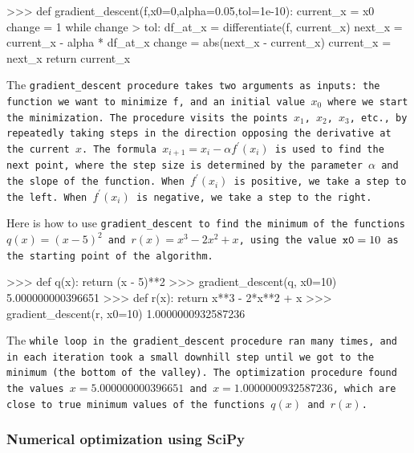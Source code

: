			\begin{codeblock}
			>>> def gradient_descent(f,x0=0,alpha=0.05,tol=1e-10):
			        current_x = x0
			        change = 1
			        while change > tol:
			            df_at_x = differentiate(f, current_x)
			            next_x = current_x - alpha * df_at_x
			            change = abs(next_x - current_x)
			            current_x = next_x
			        return current_x
			\end{codeblock} 

			The  \tt{gradient\_descent} procedure takes two arguments as inputs:
			the function we want to minimize \tt{f},
			and an initial value $x_0$ where we start the minimization.
			The procedure visits the points $x_1$, $x_2$, $x_3$, etc.,
			by repeatedly taking steps
			in the direction opposing the derivative at the current $x$.
			The formula $x_{i+1} = x_i - \alpha f^{\prime\!}(x_i)$ is used to find the next point,
			where the step size is determined by the parameter $\alpha$
			and the slope of the function.
			When $f^{\prime\!}(x_i)$ is positive,
			we take a step to the left.
			When $f^{\prime\!}(x_i)$ is negative,
			we take a step to the right.

			Here is how to use \tt{gradient\_descent}
			to find the minimum of the functions $q(x) = (x-5)^2$ and $r(x) = x^3-2x^2+x$,
			using the value $\tt{x0} = 10$ as the starting point of the algorithm.

			\begin{codeblock}
			>>> def q(x):
			        return (x - 5)**2
			>>> gradient_descent(q, x0=10)
			5.000000000396651
			>>> def r(x):
			        return x**3 - 2*x**2 + x
			>>> gradient_descent(r, x0=10)
			1.0000000932587236
			\end{codeblock}

			\noindent
			The \tt{while} loop in the \tt{gradient\_descent} procedure ran many times,
			and in each iteration took a small downhill step
			until we got to the minimum (the bottom of the valley).
			The optimization procedure found the values $x=5.000000000396651$
			and $x=1.0000000932587236$,
			which are close to true minimum values of the functions $q(x)$ and $r(x)$.




		\subsubsection{Numerical optimization using SciPy}

